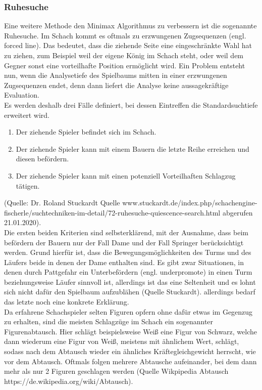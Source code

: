 \subsubsection{Ruhesuche}
Eine weitere Methode den Minimax Algorithmus zu verbessern ist die sogenannte Ruhesuche.
Im Schach kommt es oftmals zu erzwungenen Zugsequenzen (engl. forced line).
Das bedeutet, dass die ziehende Seite eine eingeschränkte Wahl hat zu ziehen, zum Beispiel weil der eigene König im Schach steht, oder weil dem Gegner sonst eine vorteilhafte Position ermöglicht wird.
Ein Problem entsteht nun, wenn die Analysetiefe des Spielbaums mitten in einer erzwungenen Zugsequenzen endet, denn dann liefert die Analyse keine aussagekräftige Evaluation.\\
Es werden deshalb drei Fälle definiert, bei dessen Eintreffen die Standardsuchtiefe erweitert wird.
\begin{enumerate}
    \item Der ziehende Spieler befindet sich im Schach.
    \item Der ziehende Spieler kann mit einem Bauern die letzte Reihe erreichen und diesen befördern.
    \item Der ziehende Spieler kann mit einen potenziell Vorteilhaften Schlagzug tätigen.
\end{enumerate}
(Quelle: Dr. Roland Stuckardt Quelle www.stuckardt.de/index.php/schachengine-fischerle/suchtechniken-im-detail/72-ruhesuche-quiescence-search.html abgerufen 21.01.2020).\\
Die ersten beiden Kriterien sind selbsterklärend, mit der Ausnahme, dass beim befördern der Bauern nur der Fall Dame und der Fall Springer berücksichtigt werden.
Grund hierfür ist, dass die Bewegungsmöglichkeiten des Turms und des Läufers beide in denen der Dame enthalten sind.
Es gibt zwar Situationen, in denen durch Pattgefahr ein Unterbefördern (engl. underpromote) in einen Turm beziehungsweise Läufer sinnvoll ist, allerdings ist das eine Seltenheit und es lohnt sich nicht dafür den Spielbaum aufzublähen (Quelle Stuckardt).
allerdings bedarf das letzte noch eine konkrete Erklärung.\\
Da erfahrene Schachspieler selten Figuren opfern ohne dafür etwas im Gegenzug zu erhalten, sind die meisten Schlagzüge im Schach ein sogenannter Figurenabtausch.
Hier schlägt beispielsweise Weiß eine Figur von Schwarz, welche dann wiederum eine Figur von Weiß, meistens mit ähnlichem Wert, schlägt, sodass nach dem Abtausch wieder ein ähnliches Kräftegleichgewicht herrscht, wie vor dem Abtausch.
Oftmals folgen mehrere Abtausche aufeinander, bei dem dann mehr als nur 2 Figuren geschlagen werden (Quelle Wikpipedia Abtausch https://de.wikipedia.org/wiki/Abtausch).
